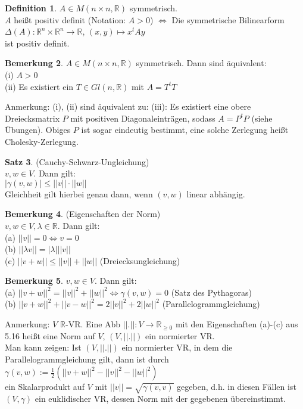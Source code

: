 \documentclass[10pt,a4paper,numbers=endperiod]{scrartcl}
\theoremstyle{definition}
\newtheorem{satz}{Satz}[section]
\newtheorem{defi}[satz]{Definition}
\newtheorem{bem}[satz]{Bemerkung}
\def\RR{{\mathbb R}}
\begin{document}
\begin{defi}
	$A \in M(n \times n, \RR)$ symmetrisch.\\
	$A$ heißt positiv definit (Notation: $A > 0$) $\Leftrightarrow$ Die symmetrische Bilinearform $\varDelta(A): \RR^n \times \RR^n \rightarrow \RR$, $(x,y) \mapsto x^t A y$\\
	ist positiv definit.
\end{defi}

\begin{bem}
	$A \in M(n \times n, \RR)$ symmetrisch. Dann sind äquivalent:\\
	(i) $A > 0$\\
	(ii) Es existiert ein $T \in Gl(n, \RR)$ mit $A = T^tT$
\end{bem}

Anmerkung: (i), (ii) sind äquivalent zu: (iii): Es existiert eine obere Dreiecksmatrix $P$ mit positiven Diagonaleinträgen, sodass $A = P^tP$ (siehe Übungen). Obiges $P$ ist sogar eindeutig bestimmt, eine solche Zerlegung heißt Cholesky-Zerlegung.

\begin{satz}
	(Cauchy-Schwarz-Ungleichung)\\
	$v,w \in V$. Dann gilt:\\
	$|\gamma (v,w)| \leq ||v|| \cdot ||w||$\\
	Gleichheit gilt hierbei genau dann, wenn $(v,w)$ linear abhängig.
\end{satz}

\begin{bem}
	(Eigenschaften der Norm)\\
	$v,w \in V, \lambda \in \RR$. Dann gilt:\\
	(a) $||v|| = 0 \Leftrightarrow v = 0$\\
	(b) $||\lambda v|| = |\lambda| ||v||$\\
	(c) $||v+w|| \leq ||v|| + ||w||$ (Dreiecksungleichung)
\end{bem}

\begin{bem}
	$v,w \in V$. Dann gilt:\\
	(a) $||v+w||^2 = ||v||^2 + ||w||^2 \Leftrightarrow \gamma(v,w) = 0$ (Satz des Pythagoras)\\
	(b) $||v+w||^2 + ||v-w||^2 = 2 ||v||^2 + 2 ||w||^2$ (Parallelogrammgleichung)
\end{bem}
\newpage
Anmerkung: $V$ $\RR$-VR. Eine Abb $||.||: V \rightarrow \RR_{\geq 0}$ mit den Eigenschaften (a)-(c) aus 5.16 heißt eine Norm auf $V$, $(V, ||.||)$ ein normierter VR.\\
Man kann zeigen: Ist $(V, ||.||)$ ein normierter VR, in dem die Parallelogrammgleichung gilt, dann ist durch\\
$\gamma(v,w) := \frac{1}{2} (||v+w||^2 - ||v||^2 - ||w||^2)$\\
ein Skalarprodukt auf $V$ mit $||v|| = \sqrt{\gamma (v,v)}$ gegeben, d.h. in diesen Fällen ist $(V, \gamma)$ ein euklidischer VR, dessen Norm mit der gegebenen übereinstimmt. 
\end{document}
